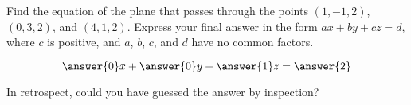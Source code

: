\documentclass{ximera}
\author{Jim Talamo}
\begin{document}
\begin{exercise}
Find the equation of the plane that passes through the points $(1,-1,2)$, $(0,3,2)$, and $(4,1,2)$.  Express your final answer in the form $ax+by+cz=d$, where $c$ is positive, and $a$, $b$, $c$, and $d$ have no common factors.

\[
\answer{0}x+\answer{0}y+\answer{1}z=\answer{2}
\]

\begin{feedback}[correct]
In retrospect, could you have guessed the answer by inspection?
\end{feedback}

\end{exercise}
\end{document}
